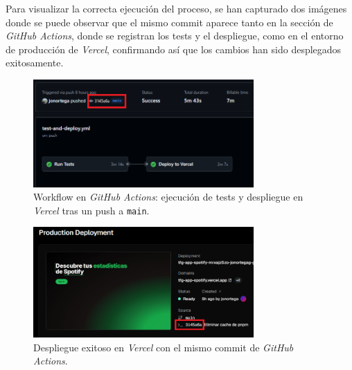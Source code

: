 Para visualizar la correcta ejecución del proceso, se han capturado dos imágenes donde se puede observar que el mismo commit aparece tanto en la sección de \textit{GitHub Actions}, donde se registran los tests y el despliegue, como en el entorno de producción de \textit{Vercel}, confirmando así que los cambios han sido desplegados exitosamente.

\begin{figure}[H]
    \centering
    \includegraphics[width=0.75\textwidth]{figures/despliegue/github_actions.png}
    \caption{Workflow en \textit{GitHub Actions}: ejecución de tests y despliegue en \textit{Vercel} tras un push a \texttt{main}.}
    \label{fig:github_actions}
\end{figure}

\begin{figure}[H]
    \centering
    \includegraphics[width=0.75\textwidth]{figures/despliegue/actions_deploy_vercel.png}
    \caption{Despliegue exitoso en \textit{Vercel} con el mismo commit de \textit{GitHub Actions}.}
    \label{fig:actions_deploy_vercel}
\end{figure}